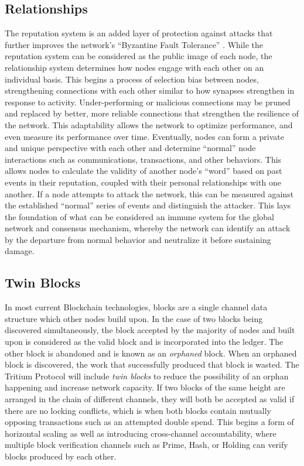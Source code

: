 \documentclass[11pt]{article}
\begin{document}
\subsection{Relationships}

The reputation system is an added layer of protection against attacks that further improves the network's ``Byzantine Fault Tolerance'' \cite{Byzantine}.
While the reputation system can be considered as the public image of each node, the relationship system determines how nodes engage with each other on an individual basis. 
This begins a process of selection bias between nodes, strengthening connections with each other similar to how synapses strengthen in response to activity. 
Under-performing or malicious connections may be pruned and replaced by better, more reliable connections that strengthen the resilience of the network.
This adaptability allows the network to optimize performance, and even measure its performance over time. 
Eventually, nodes can form a private and unique perspective with each other and determine ``normal'' node interactions such as communications, transactions, and other behaviors.
This allows nodes to calculate the validity of another node's ``word'' based on past events in their reputation, coupled with their personal relationships with one another. 
If a node attempts to attack the network, this can be measured against the established ``normal'' series of events and distinguish the attacker.
This lays the foundation of what can be considered an immune system for the global network and consensus mechanism, whereby the network can identify an attack by the departure from normal behavior and neutralize it before sustaining damage.

\subsection{Twin Blocks}

In most current Blockchain technologies, blocks are a single channel data structure which other nodes build upon.
In the case of two blocks being discovered simultaneously, the block accepted by the majority of nodes and built upon is considered as the valid block and is incorporated into the ledger. The other block is abandoned and is known as an \textit{orphaned} block.
When an orphaned block is discovered, the work that successfully produced that block is wasted.
The Tritium Protocol will include \textit{twin blocks} to reduce the possibility of an orphan happening and increase network capacity.
If two blocks of the same height are arranged in the chain of different channels, they will both be accepted as valid if there are no locking conflicts, which is when both blocks contain mutually opposing transactions such as an attempted double spend.
This begins a form of horizontal scaling as well as introducing cross-channel accountability, where multiple block verification channels such as Prime, Hash, or Holding can verify blocks produced by each other.
\end{document}
